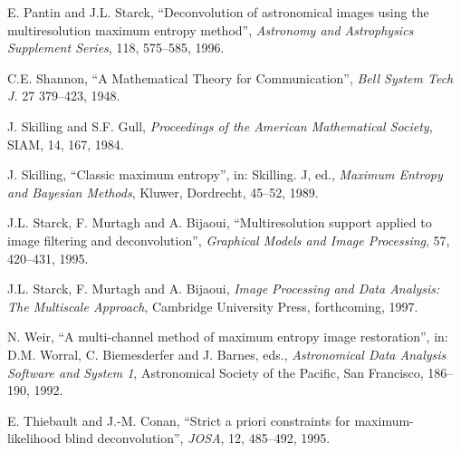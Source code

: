 \documentclass[11pt,a4paper]{article}
\begin{document}
\begin{thebibliography}{99}
 E. Pantin and J.L. Starck, ``Deconvolution of 
astronomical images using the multiresolution maximum entropy method'', 
 {\it Astronomy and Astrophysics Supplement Series}, 118, 575--585, 1996. 


 C.E. Shannon,  
``A Mathematical Theory for Communication'', {\it Bell System Tech J.} 27 
379--423, 1948.


 J. Skilling and S.F. Gull, {\it Proceedings of 
the American Mathematical Society}, SIAM, 14, 167, 1984.

 J. Skilling, ``Classic maximum entropy'', 
in: Skilling. J, ed., {\it Maximum 
Entropy and
Bayesian Methods}, Kluwer, Dordrecht, 45--52, 1989. 

  J.L. Starck, F. Murtagh and  A. Bijaoui, 
``Multiresolution support
 applied to image filtering and deconvolution'', {\it Graphical
Models and Image Processing}, 57, 420--431, 1995.

 J.L. Starck, F. Murtagh  and A. Bijaoui,  
{\it Image Processing and Data Analysis: The
Multiscale Approach},  Cambridge University Press, forthcoming, 1997.

 N. Weir, ``A multi-channel method of maximum entropy image
restoration'', in: D.M. Worral, C. Biemesderfer and J. Barnes, 
eds., {\it Astronomical Data Analysis Software and System 1}, Astronomical 
Society of the Pacific, San Francisco, 186--190, 1992.

 E. Thiebault and J.-M. Conan, ``Strict a priori
constraints for maximum-likelihood blind deconvolution'', {\it JOSA}, 
12, 485--492, 1995.

\end{thebibliography}
\end{document}
